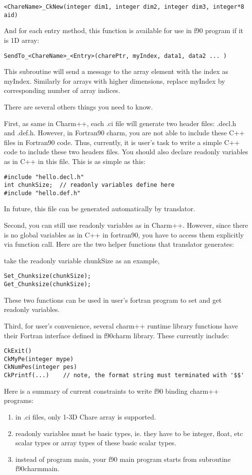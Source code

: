 \documentclass[11pt]{article}
\begin{document}
  \verb+<ChareName>_CkNew(integer dim1, integer dim2, integer dim3, integer*8 aid)+

And for each entry method, this function is available for use in f90 program
if it is 1D array:

  \verb+SendTo_<ChareName>_<Entry>(charePtr, myIndex, data1, data2 ... )+

  This subroutine will send a message to the array element with the index
as myIndex. Similarly for arrays with higher dimensions, replace myIndex by
corresponding number of array indices.

There are several others things you need to know.

First, as same in Charm++, each .ci file will generate two header files:
.decl.h and .def.h. However, in Fortran90 charm, you are not able to include 
these C++ files in Fortran90 code. Thus, currently, it is user's 
task to write a simple C++ code to include these two headers files. 
You should also declare readonly variables as in C++ in this file. This is as 
simple as this:

\begin{verbatim}
#include "hello.decl.h"
int chunkSize; 	// readonly variables define here
#include "hello.def.h"
\end{verbatim}

In future, this file can be generated automatically by translator.

Second, you can still use readonly variables as in Charm++. However, since
there is no global variables as in C++ in fortran90, you have to access them
explicitly via function call. Here are the two helper functions that 
translator generates:

take the readonly variable chunkSize as an example,
\begin{verbatim}
Set_Chunksize(chunkSize);
Get_Chunksize(chunkSize);
\end{verbatim}
These two functions can be used in user's fortran program to set and get 
readonly variables.

Third, for user's convenience, several charm++ runtime library functions
have their Fortran interface defined in f90charm library. These currently
include:
\begin{verbatim}
CkExit()
CkMyPe(integer mype)
CkNumPes(integer pes)
CkPrintf(...)    // note, the format string must terminated with '$$'
\end{verbatim}

Here is a summary of current constraints to write f90 binding charm++ programs:
\begin{enumerate}
\item in .ci files, only 1-3D Chare array is supported.
\item readonly variables must be basic types, ie. they have to be integer, 
float, etc scalar types or array types of these basic scalar types.
\item instead of program main, your f90 main program starts from subroutine 
f90charmmain.
\end{enumerate}
\end{document}
